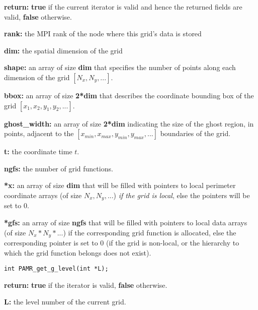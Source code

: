 \documentclass[aps,amssymb,unsortedaddress,nofootinbib]{revtex4}
\def\lsep{\itemsep 0.05in}
\begin{document}
\begin{list}{}{\lsep}
\item {\bf return:} {\bf true} if the current iterator is valid and hence the returned
                               fields are valid, {\bf false} otherwise.
\item {\bf *rank:} the MPI rank of the node where this grid's data is stored
\item {\bf *dim:} the spatial dimension of the grid
\item {\bf *shape:} an array of size {\bf dim} that specifies the number of points
                    along each dimension of the grid $[N_x,N_y,...]$.
\item {\bf *bbox:} an array of size {\bf 2*dim} that describes the coordinate bounding
                   box of the grid $[x_1,x_2,y_1,y_2,...]$.
\item {\bf *ghost\_width:} an array of size {\bf 2*dim} indicating the size of the
                   ghost region, in points, adjacent to the 
                   $[x_{min},x_{max},y_{min},y_{max},...]$ boundaries of the grid.
\item {\bf *t:} the coordinate time $t$.
\item {\bf *ngfs:} the number of grid functions.
\item {\bf **x:} an array of size {\bf dim} that will be filled with pointers
                 to local perimeter coordinate arrays (of size $N_x, N_y, ...$)
                 {\em if the grid is local}, else the pointers will be set to 0.
\item {\bf **gfs:} an array of size {\bf ngfs} that will be filled with pointers
                 to local data arrays (of size $N_x*N_y*...$) if the 
                 corresponding grid function is allocated,
                 else the corresponding pointer is set to 0 (if the grid is
                 non-local, or the hierarchy to which the grid function belongs
                 does not exist).
\end{list}


\begin{verbatim}
int PAMR_get_g_level(int *L);
\end{verbatim}
\begin{list}{}{\lsep}
\item {\bf return:} {\bf true} if the iterator is valid, {\bf false} otherwise.
\item {\bf *L:} the level number of the current grid.
\end{list}
\end{document}
